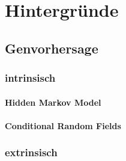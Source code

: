 \chapter{Hintergründe}
\section{Genvorhersage}
\subsection{intrinsisch}
\subsubsection{Hidden Markov Model}
\subsubsection{Conditional Random Fields}
\subsection{extrinsisch}